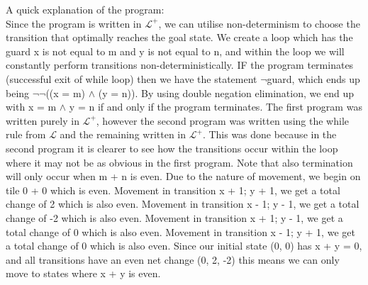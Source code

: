 \documentclass{article}
\begin{document}
\begin{enumerate}[(a)]
    A quick explanation of the program:\\
    Since the program is written in $\mathcal{L}^{+}$, we can utilise non-determinism to choose the transition that optimally reaches the goal state. We create a loop which has the guard x is not equal to m and y is not equal to n, and within the loop we will constantly perform transitions non-deterministically. IF the program terminates (successful exit of while loop) then we have the statement $\neg$guard, which ends up being $\neg\neg$((x = m) $\land$ (y = n)). By using double negation elimination, we end up with x = m $\land$ y = n if and only if the program terminates. The first program was written purely in  $\mathcal{L}^{+}$, however the second program was written using the while rule from  $\mathcal{L}$ and the remaining written in $\mathcal{L}^{+}$. This was done because in the second program it is clearer to see how the transitions occur within the loop where it may not be as obvious in the first program. Note that also termination will only occur when m + n is even. Due to the nature of movement, we begin on tile 0 + 0 which is even. Movement in transition x + 1; y + 1, we get a total change of 2 which is also even. Movement in transition x - 1; y - 1, we get a total change of -2 which is also even. Movement in transition x + 1; y - 1, we get a total change of 0 which is also even. Movement in transition x - 1; y + 1, we get a total change of 0 which is also even. Since our initial state (0, 0) has x + y = 0, and all transitions have an even net change (0, 2, -2) this means we can only move to states where x + y is even. 



\end{enumerate}
\end{document}
